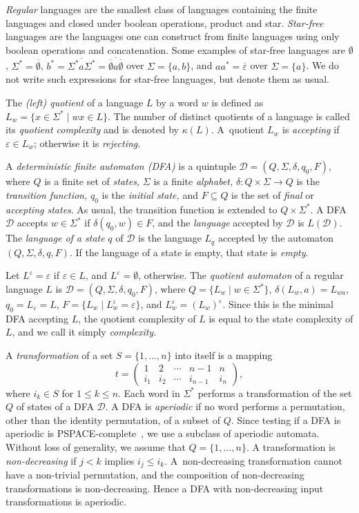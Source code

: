 \documentclass{llncs}
\renewcommand{\le}{\leqslant}
\newcommand{\ol}{\overline}
\newcommand{\eps}{\varepsilon}
\newcommand{\emp}{\emptyset}
\newcommand{\Sig}{\Sigma}
\newcommand{\cD}{{\mathcal D}}
\begin{document}
\emph{Regular} languages are the smallest class of languages containing the finite languages and closed under boolean operations, product  and  star. 
\emph{Star-free} languages are the languages one can construct from finite languages using only boolean operations and concatenation.
Some examples of star-free languages are $\emp$, $\Sig^*=\ol{\emp}$, 
$b^*=\ol{\Sig^*a\Sig^*}= \ol {\ol{\emp}a\ol{\emp}}$ over $\Sig=\{a,b\}$,  and
$aa^*=\ol{\eps}$ over $\Sig=\{a\}$. We do not write such expressions for star-free  languages, but denote them as usual.

The \emph{(left) quotient} of a language $L$ by a word $w$ is defined as $L_w=\{x\in \Sig^* \mid wx \in L \}$. The number of distinct quotients of a language  is called its \emph{quotient complexity}  and is denoted by $\kappa(L)$. 
A~quotient $L_w$ is \emph{accepting} if $\eps\in L_w$; 
otherwise it is \emph{rejecting}.


A \emph{deterministic finite automaton (DFA)} is a quintuple $\cD=(Q,\Sigma,\delta,q_0,F)$, where $Q$ is a finite set of \emph{states,} $\Sigma$ is a finite \emph{alphabet,} $\delta:Q\times\Sigma\rightarrow Q$ is the \emph{transition function,} $q_0$ is the \emph{initial state,} and $F\subseteq Q$ is the set of \emph{final} or \emph{accepting states\/}. 
As usual, the transition function is extended to $Q\times\Sigma^*$. 
A DFA $\cD$ accepts $w\in\Sigma^*$ if ${\delta}(q_0,w)\in F$, and the \emph{language} accepted by $\cD$ is $L(\cD)$. 
The \emph{language of a state} $q$ of $\cD$ is the language $L_q$ accepted by the automaton $(Q,\Sigma,\delta,q,F)$. 
If the language of a state is empty, that state is \emph{empty}.

Let $L^\eps=\eps$ if $\eps\in L$, and $L^\eps=\emp$, otherwise.
The \emph{quotient automaton} of a regular language $L$ is 
$\cD=(Q, \Sig, \delta, q_0,F)$, where $Q=\{L_w\mid w\in\Sig^*\}$, $\delta(L_w,a)=L_{wa}$, 
$q_0=L_\eps=L$,  $F=\{L_w\mid L_w^\eps=\eps\}$, and $L_w^\eps=(L_w)^\eps$.
Since this  is the minimal DFA accepting $L$, the quotient complexity of $L$ is equal to the state complexity of $L$, and we call it simply  \emph{complexity}.

A \emph{transformation} of a set $S=\{1,\ldots,n\}$ into itself is a mapping 
$$
t=\left( \begin{array}{ccccc}
1 & 2 &   \cdots &  n-1 & n \\
i_1 & i_2 &   \cdots &  i_{n-1} & i_n
\end{array} \right ),
$$
where $i_k\in S$ for $1\le k\le n$. 
Each word in $\Sig^*$ performs a transformation of the set $Q$ of states of a DFA $\cD$.
A DFA is \emph{aperiodic} if no word performs a permutation, other than the identity permutation, of a subset of $Q$.
Since testing if a DFA is aperiodic is PSPACE-complete~\cite{ChHu91}, we  use a subclass of aperiodic automata. 
Without loss of generality, we assume that $Q=\{1,\ldots,n\}$.
A transformation is \emph{non-decreasing} if $j< k$ implies $i_j\le i_k$.
A~non-decreasing transformation cannot have a non-trivial permutation, and the composition of non-decreasing transformations is non-decreasing. 
Hence a DFA with non-decreasing input transformations is aperiodic.
\end{document}
